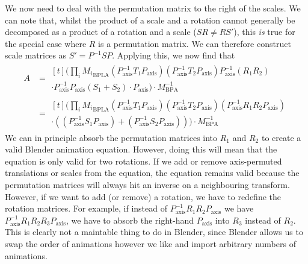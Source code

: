 \documentclass{article}
\begin{document}
We now need to deal with the permutation matrix to the right of the scales. We can note that, whilst the product of a scale and a rotation cannot generally be decomposed as a product of a rotation and a scale ($SR \neq RS' $), this \textit{is} true for the special case where $R$ is a permutation matrix. We can therefore construct scale matrices as $S' = P^{-1}SP$. Applying this, we now find that
\begin{align}
A &= \begin{multlined}[t]
\Bigg( \prod_{i} {M_i}_\mathrm{BPLA}  \left(P_\mathrm{axis}^{-1} T_1 P_\mathrm{axis} \right)\left(P_\mathrm{axis}^{-1} T_2 P_\mathrm{axis} \right)  P_\mathrm{axis}^{-1} \left(R_1 R_2\right) \\
\cdot P_\mathrm{axis}^{-1} P_\mathrm{axis} \left(S_1 + S_2\right) \cdot P_\mathrm{axis} \Bigg) \cdot M_\mathrm{BPA}^{-1}
\end{multlined}\\
&= \begin{multlined}[t]
\Bigg( \prod_{i} {M_i}_\mathrm{BPLA}  \left(P_\mathrm{axis}^{-1} T_1 P_\mathrm{axis} \right)\left(P_\mathrm{axis}^{-1} T_2 P_\mathrm{axis} \right)  \left( P_\mathrm{axis}^{-1} R_1 R_2  P_\mathrm{axis}\right) \\
\cdot \left( \left( P_\mathrm{axis}^{-1} S_1 P_\mathrm{axis}\right) + \left( P_\mathrm{axis}^{-1} S_2 P_\mathrm{axis} \right)\right)\Bigg) \cdot M_\mathrm{BPA}^{-1}
\end{multlined}
\end{align}
We can in principle absorb the permutation matrices into $R_1$ and $R_2$ to create a valid Blender animation equation. However, doing this will mean that the equation is only valid for two rotations. If we add or remove axis-permuted translations or scales from the equation, the equation remains valid because the permutation matrices will always hit an inverse on a neighbouring transform. However, if we want to add (or remove) a rotation, we have to redefine the rotation matrices. For example, if instead of $P^{-1}_\mathrm{axis} R_1 R_2 P_\mathrm{axis}$ we have $P^{-1}_\mathrm{axis} R_1 R_2 R_3 P_\mathrm{axis}$, we have to absorb the right-hand $P_\mathrm{axis}$ into $R_3$ instead of $R_2$. This is clearly not a maintable thing to do in Blender, since Blender allows us to swap the order of animations however we like and import arbitrary numbers of animations.
\end{document}
